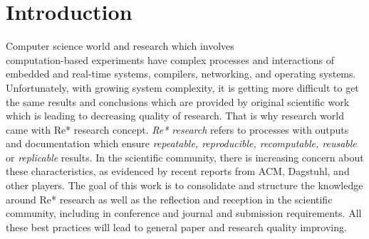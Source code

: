 \documentclass{vldb}
\begin{document}
\section{Introduction}
Computer science world and research which involves \\ computation-based experiments have complex processes and interactions of embedded and real-time systems, compilers, networking, and operating systems. Unfortunately, with growing system complexity, it is getting more difficult to get the same results and conclusions which are provided by original scientific work which is leading to decreasing quality of research. That is why research world came with Re* research concept. \emph{Re* research} refers to processes with outputs and documentation which ensure \emph{repeatable, reproducible, recomputable, reusable} or \emph{replicable} results. In the scientific community, there is increasing concern about these characteristics, as evidenced by recent reports from ACM, Dagstuhl, and other players. The goal of this work is to consolidate and structure the knowledge around Re* research as well as the reflection and reception in the scientific community, including in conference and journal and submission requirements. All these best practices will lead to general paper and research quality improving.
\end{document}
